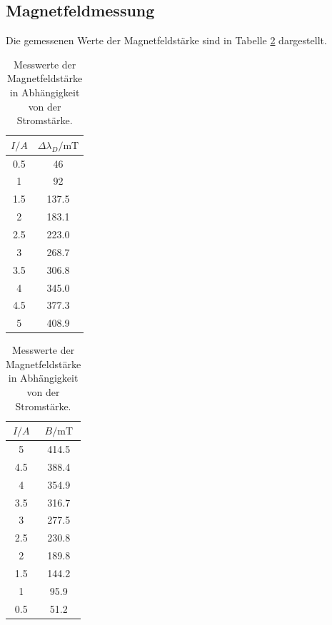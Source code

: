 \subsection{Magnetfeldmessung}
Die gemessenen Werte der Magnetfeldstärke sind in Tabelle \ref{tab:atab1} dargestellt.
\FloatBarrier
\begin{table}[h]
    \centering
    \caption{Messwerte der Magnetfeldstärke in Abhängigkeit von der Stromstärke.}
    \begin{minipage}{0.45\textwidth}
        \centering
        \label{tab:atab1}
        \begin{tabular}{c c}
            \toprule
            {$I / A$} & {$\Delta \lambda_D / \text{mT}$} \\
            \midrule
            0.5 & 46    \\ 
            1   & 92    \\
            1.5 & 137.5 \\
            2   & 183.1 \\
            2.5 & 223.0 \\
            3   & 268.7 \\
            3.5 & 306.8 \\
            4   & 345.0 \\
            4.5 & 377.3 \\
            5   & 408.9 \\
            \bottomrule
        \end{tabular}
    \end{minipage} \hfill%
    \begin{minipage}{0.45\textwidth}
        \centering
        \begin{tabular}{c c}
            \toprule
            {$I / A$} & {$B / \text{mT}$} \\
            \midrule
            5   & 414.5 \\
            4.5 & 388.4 \\
            4   & 354.9 \\
            3.5 & 316.7 \\
            3   & 277.5 \\
            2.5 & 230.8 \\
            2   & 189.8 \\
            1.5 & 144.2 \\
            1   & 95.9  \\
            0.5 & 51.2  \\
            \bottomrule
        \end{tabular}
    \end{minipage}
\end{table}
